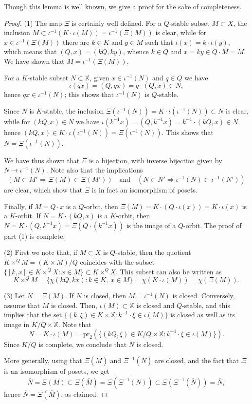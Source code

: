 Though this lemma is well known, we give a proof for the sake of completeness.

\begin{proof}
(1) The map $\Xi$ is certainly well defined.
For a $Q$-stable subset $M\subset X$,
the inclusion $M\subset\iota^{-1}(K\cdot\iota(M))=\iota^{-1}(\Xi(M))$ is clear, while for $x\in\iota^{-1}(\Xi(M))$ there are $k\in K$ and $y\in M$ such that $\iota(x)=k\cdot\iota(y)$, which means that $(Q,x)=(kQ,ky)$, whence $k\in Q$ and $x=ky\in Q\cdot M=M$. We have shown that $M=\iota^{-1}(\Xi(M))$.

For a $K$-stable subset $N\subset \mathbb{X}$,
given $x\in \iota^{-1}(N)$ and $q\in Q$ we have
\[\iota(qx)=(Q,qx)=q\cdot (Q,x)\in N,\]
hence $qx\in\iota^{-1}(N)$; this shows that $\iota^{-1}(N)$ is $Q$-stable.

Since $N$ is $K$-stable, the inclusion $\Xi(\iota^{-1}(N))=K\cdot \iota(\iota^{-1}(N))\subset N$ is clear, while for $(kQ,x)\in N$ we have
$\iota(k^{-1}x)=(Q,k^{-1}x)=k^{-1}\cdot(kQ,x)\in N$, hence $(kQ,x)\in K\cdot\iota(\iota^{-1}(N))=\Xi(\iota^{-1}(N))$. This shows that $N=\Xi(\iota^{-1}(N))$.

We have thus shown that $\Xi$ is a bijection, with inverse bijection given by $N\mapsto \iota^{-1}(N)$. Note also that the implications
\[(M\subset M'\Rightarrow \Xi(M)\subset\Xi(M'))\quad\mbox{and}\quad (N\subset N'\Rightarrow \iota^{-1}(N)\subset\iota^{-1}(N'))\]
are clear, which show that $\Xi$ is in fact an isomorphism of posets.

Finally, if $M=Q\cdot x$ is a $Q$-orbit, then $\Xi(M)=K\cdot(Q\cdot\iota(x))=K\cdot \iota(x)$ is a $K$-orbit. If $N=K\cdot(kQ,x)$ is a $K$-orbit, then $N=K\cdot(Q,k^{-1}x)=\Xi(Q\cdot(k^{-1}x))$ is the image of a $Q$-orbit. The proof of part (1) is complete.



(2) First we note that, if $M\subset X$ is $Q$-stable, then the quotient $K\times^QM=(K\times M)/Q$ coincides with the subset $\{[k,x]\in K\times^QX:x\in M\}\subset K\times^QX$. This subset can also be written as
\[K\times^QM=\{\chi(kQ,kx):k\in K,\ x\in M\}=\chi(K\cdot\iota(M))=\chi(\Xi(M)).\]

(3) Let $N=\Xi(M)$. If $N$ is closed, then $M=\iota^{-1}(N)$ is closed.
Conversely, assume that $M$ is closed.
Then, $\iota(M)\subset \mathbb{X}$ is closed and $Q$-stable, and this implies that
the set $\{(k,\xi)\in K\times\mathbb{X}:k^{-1}\cdot \xi\in\iota(M)\}$ is closed as well as its image in $K/Q\times\mathbb{X}$. Note that
\[N=K\cdot \iota(M)=\mathrm{pr}_2(\{(kQ,\xi)\in K/Q\times\mathbb{X}:k^{-1}\cdot \xi\in\iota(M)\}).\]
Since $K/Q$ is complete, we conclude that $N$ is closed.




More generally, using that $\Xi(\overline{M})$ and $\Xi^{-1}(\overline{N})$ are closed, and the fact that $\Xi$ is an isomorphism of posets, we get
\[\overline{N}=\overline{\Xi(M)}\subset\Xi(\overline{M})=\Xi(\overline{\Xi^{-1}(N)})\subset\Xi(\Xi^{-1}(\overline{N}))=\overline{N},\]
hence $\overline{N}=\Xi(\overline{M})$, as claimed.\end{proof}

